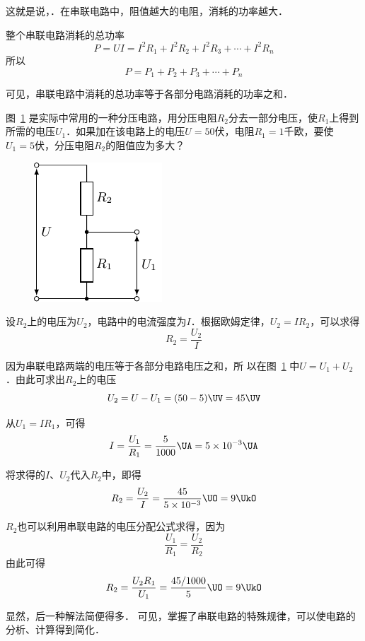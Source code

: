 这就是说，．在串联电路中，阻值越大的电阻，消耗的功率越大．

整个串联电路消耗的总功率
\[P=UI=I^2R_1 +I^2R_2+I^2R_3+\cdots+I^2R_n
\]
所以
\[P=P_1+P_2+P_3+\cdots +P_n\]

可见，串联电路中消耗的总功率等于各部分电路消耗的功率之和．



\begin{example}
    图~\ref{fig_B_7-8} 是实际中常用的一种分压电路，用分压电阻$R_2$分去一部分电压，使$R_1$上得到所需的电压$U_1$．如果加在该电路上的电压$U=50$伏，电阻$R_1=1$千欧，要使$U_1=
    5$伏，分压电阻$R_2$的阻值应为多大？
\end{example}

\begin{figure}[htbp]
	\centering
	\includegraphics{fig/B/7-8.pdf}
	\caption{}\label{fig_B_7-8}
\end{figure}

\begin{solution}
    设$R_2$上的电压为$U_2$，电路中的电流强度为$I$．根据欧姆定律，$U_2=IR_2$，可以求得
    \[R_2=\frac{U_2}{I}\]

因为串联电路两端的电压等于各部分电路电压之和，所
以在图~\ref{fig_B_7-8} 中$U=U_1+U_2$．由此可求出$R_2$上的电压
\[U_2=U-U_1=(50-5) \UV =45 \UV\]

从$U_1=IR_1$，可得
\[ I=\frac{U_1}{R_1}=\frac{5}{1000} \UA =5\times10^{-3} \UA\]

将求得的$I$、$U_2$代入$R_2$中，即得
\[R_2=\frac{U_2}{I}=\frac{45}{5\times10^{-3}} \UO =9\UkO\]

$R_2$也可以利用串联电路的电压分配公式求得，因为
\[\frac{U_1}{R_1}=\frac{U_2}{R_2}\]
由此可得
\[R_2=\frac{U_2R_1}{U_1}=\frac{45/1000}{5}\UO=9\UkO \]
\end{solution}

显然，后一种解法简便得多．
可见，掌握了串联电路的特殊规律，可以使电路的分析、计算得到简化．

